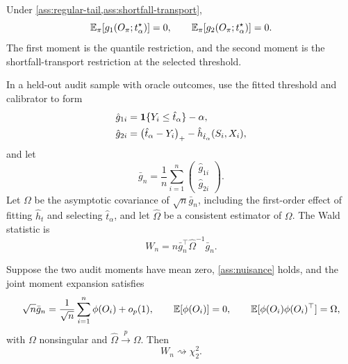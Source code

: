 \begin{theorem}
\label{thm:formal-two-moment}
Under \cref{ass:regular-tail,ass:shortfall-transport},
\[
\mathbb{E}_\pi[g_1(O_\pi;t_\alpha^\star)]=0,
\qquad
\mathbb{E}_\pi[g_2(O_\pi;t_\alpha^\star)]=0.
\]
The first moment is the quantile restriction, and the second moment is the
shortfall-transport restriction at the selected threshold.
\end{theorem}

\begin{twocolproof}
\end{twocolproof}

In a held-out audit sample with oracle outcomes, use the fitted threshold and
calibrator to form
\begin{align}
\hat g_{1i}
&=\mathbf{1}\{Y_i\le \hat t_\alpha\}-\alpha,\\
\hat g_{2i}
&=\left(\hat t_\alpha-Y_i\right)_{+}
-\hat h_{\hat t_\alpha}(S_i,X_i),
\end{align}
and let
\[
\bar g_n=\frac{1}{n}\sum_{i=1}^n
\begin{pmatrix}
\hat g_{1i}\\
\hat g_{2i}
\end{pmatrix}.
\]
Let $\Omega$ be the asymptotic covariance of $\sqrt{n}\bar g_n$, including the
first-order effect of fitting $\hat h_t$ and selecting $\hat t_\alpha$, and let
$\hat\Omega$ be a consistent estimator of $\Omega$. The Wald statistic is
\begin{equation}
W_n=n\bar g_n^\top\hat\Omega^{-1}\bar g_n.
\label{eq:formal-wald}
\end{equation}

\begin{theorem}
\label{thm:formal-wald-limit}
Suppose the two audit moments have mean zero, \cref{ass:nuisance} holds, and
the joint moment expansion satisfies
\[
\sqrt{n}\bar g_n
=\frac{1}{\sqrt{n}}\sum_{i=1}^n \phi(O_i)+o_p(1),
\qquad
\mathbb{E}[\phi(O_i)]=0,\qquad
\mathbb{E}[\phi(O_i)\phi(O_i)^\top]=\Omega,
\]
with $\Omega$ nonsingular and $\hat\Omega\overset{p}{\to}\Omega$. Then
\[
W_n\rightsquigarrow \chi^2_2.
\]
\end{theorem}

